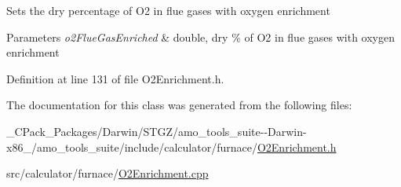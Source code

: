 Sets the dry percentage of O2 in flue gases with oxygen enrichment 
\begin{DoxyParams}{Parameters}
{\em o2\+Flue\+Gas\+Enriched} & double, dry \% of O2 in flue gases with oxygen enrichment \\
\hline
\end{DoxyParams}


Definition at line 131 of file O2\+Enrichment.\+h.



The documentation for this class was generated from the following files\+:\begin{DoxyCompactItemize}
\item 
\+\_\+\+C\+Pack\+\_\+\+Packages/\+Darwin/\+S\+T\+G\+Z/amo\+\_\+tools\+\_\+suite-\/-\/\+Darwin-\/x86\+\_/amo\+\_\+tools\+\_\+suite/include/calculator/furnace/\hyperlink{___c_pack___packages_2_darwin_2_s_t_g_z_2amo__tools__suite--_darwin-x86__64_2amo__tools__suite_2d0f965568526e5e5911c012959c0c043}{O2\+Enrichment.\+h}\item 
src/calculator/furnace/\hyperlink{_o2_enrichment_8cpp}{O2\+Enrichment.\+cpp}\end{DoxyCompactItemize}
